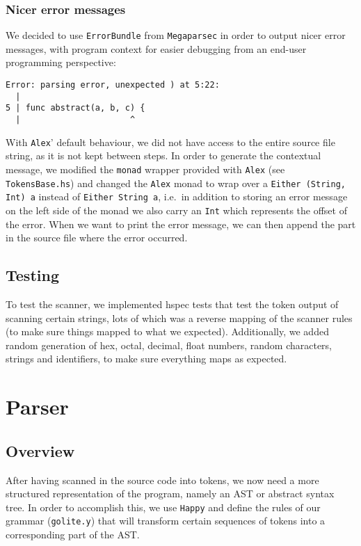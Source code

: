 \documentclass[11pt]{article}
\begin{document}
\subsubsection{Nicer error messages}
We decided to use \texttt{ErrorBundle} from
\texttt{Megaparsec}\cite{github:megaparsec} in order to output nicer
error messages, with program context for easier debugging from an
end-user programming perspective:

\begin{verbatim}
Error: parsing error, unexpected ) at 5:22:
  |
5 | func abstract(a, b, c) {
  |                      ^
\end{verbatim}

With \texttt{Alex}' default behaviour, we did not have access to the
entire source file string, as it is not kept between steps. In order
to generate the contextual message, we modified the \texttt{monad}
wrapper provided with \texttt{Alex} (see \texttt{TokensBase.hs}) and
changed the \texttt{Alex} monad to wrap over a \texttt{Either (String,
  Int) a} instead of \texttt{Either String a}, i.e.\ in addition to
storing an error message on the left side of the monad we also carry
an \texttt{Int} which represents the offset of the error. When we want
to print the error message, we can then append the part in the source
file where the error occurred.

\subsection{Testing}
To test the scanner, we implemented hspec tests that test the token
output of scanning certain strings, lots of which was a reverse
mapping of the scanner rules (to make sure things mapped to what we
expected). Additionally, we added random generation of hex, octal,
decimal, float numbers, random characters, strings and identifiers, to
make sure everything maps as expected.
\section{Parser}
\subsection{Overview}
After having scanned in the source code into tokens, we now need a
more structured representation of the program, namely an AST or
abstract syntax tree. In order to accomplish this, we use
\texttt{Happy}\cite{github:happy} and define the rules of our grammar
(\texttt{golite.y}) that will transform certain sequences of tokens
into a corresponding part of the AST.
\end{document}
